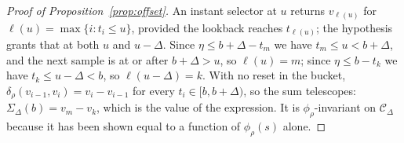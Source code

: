\begin{proof}[Proof of Proposition~\ref{prop:offset}]
An instant selector at $u$ returns $v_{\ell(u)}$ for $\ell(u)=\max\{i:t_i\le u\}$,
provided the lookback reaches $t_{\ell(u)}$; the hypothesis grants that at both $u$ and
$u-\Delta$. Since $\eta\le b+\Delta-t_m$ we have $t_m\le u<b+\Delta$, and the next sample
is at or after $b+\Delta>u$, so $\ell(u)=m$; since $\eta\le b-t_k$ we have
$t_k\le u-\Delta<b$, so $\ell(u-\Delta)=k$. With no reset in the bucket,
$\delta_\rho(v_{i-1},v_i)=v_i-v_{i-1}$ for every $t_i\in[b,b+\Delta)$, so the sum
telescopes: $\Sigma_\Delta(b)=v_m-v_k$, which is the value of the expression. It is
$\phi_\rho$-invariant on $\mathcal{C}_\Delta$ because it has been shown equal to a
function of $\phi_\rho(s)$ alone.
\end{proof}

